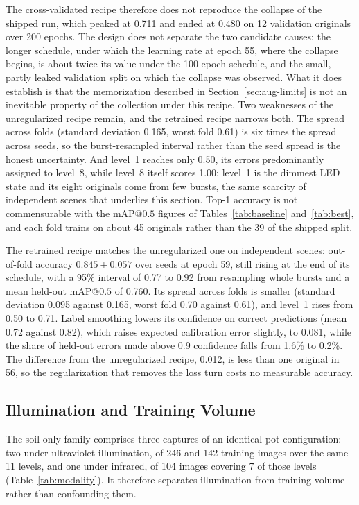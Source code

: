﻿\documentclass[journal]{IEEEtran}
\begin{document}
The cross-validated recipe therefore does not reproduce the collapse of the shipped run, which peaked at 0.711 and ended at 0.480 on 12 validation originals over 200 epochs. The design does not separate the two candidate causes: the longer schedule, under which the learning rate at epoch 55, where the collapse begins, is about twice its value under the 100-epoch schedule, and the small, partly leaked validation split on which the collapse was observed. What it does establish is that the memorization described in Section~\ref{sec:aug-limits} is not an inevitable property of the collection under this recipe. Two weaknesses of the unregularized recipe remain, and the retrained recipe narrows both. The spread across folds (standard deviation 0.165, worst fold 0.61) is six times the spread across seeds, so the burst-resampled interval rather than the seed spread is the honest uncertainty. And level~1 reaches only 0.50, its errors predominantly assigned to level~8, while level~8 itself scores 1.00; level~1 is the dimmest LED state and its eight originals come from few bursts, the same scarcity of independent scenes that underlies this section. Top-1 accuracy is not commensurable with the $\text{mAP@0.5}$ figures of Tables~\ref{tab:baseline} and~\ref{tab:best}, and each fold trains on about 45 originals rather than the 39 of the shipped split.

The retrained recipe matches the unregularized one on independent scenes: out-of-fold accuracy $0.845 \pm 0.057$ over seeds at epoch 59, still rising at the end of its schedule, with a 95\% interval of 0.77 to 0.92 from resampling whole bursts and a mean held-out $\text{mAP@0.5}$ of 0.760. Its spread across folds is smaller (standard deviation 0.095 against 0.165, worst fold 0.70 against 0.61), and level~1 rises from 0.50 to 0.71. Label smoothing lowers its confidence on correct predictions (mean 0.72 against 0.82), which raises expected calibration error slightly, to 0.081, while the share of held-out errors made above 0.9 confidence falls from 1.6\% to 0.2\%. The difference from the unregularized recipe, 0.012, is less than one original in 56, so the regularization that removes the loss turn costs no measurable accuracy.

\subsection{Illumination and Training Volume}
The soil-only family comprises three captures of an identical pot configuration: two under ultraviolet illumination, of 246 and 142 training images over the same 11 levels, and one under infrared, of 104 images covering 7 of those levels (Table~\ref{tab:modality}). It therefore separates illumination from training volume rather than confounding them.
\end{document}
